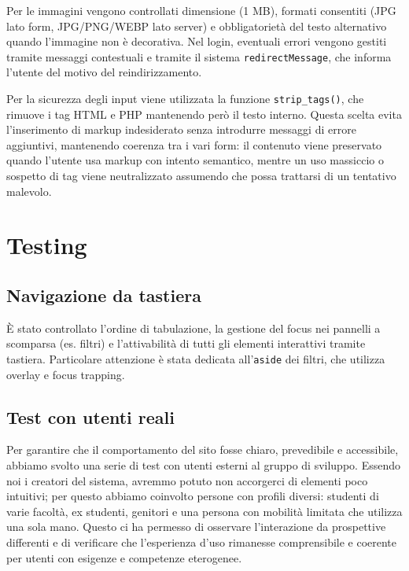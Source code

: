 \documentclass[a4paper,12pt]{article}
\begin{document}
Per le immagini vengono controllati dimensione (1 MB), formati consentiti (JPG lato form, JPG/PNG/WEBP lato server) e obbligatorietà del testo alternativo quando l’immagine non è decorativa. Nel login, eventuali errori vengono gestiti tramite messaggi contestuali e tramite il sistema \texttt{redirectMessage}, che informa l’utente del motivo del reindirizzamento.

Per la sicurezza degli input viene utilizzata la funzione \texttt{strip\_tags()}, che rimuove i tag HTML e PHP mantenendo però il testo interno. Questa scelta evita l’inserimento di markup indesiderato senza introdurre messaggi di errore aggiuntivi, mantenendo coerenza tra i vari form: il contenuto viene preservato quando l’utente usa markup con intento semantico, mentre un uso massiccio o sospetto di tag viene neutralizzato assumendo che possa trattarsi di un tentativo malevolo.

\section{Testing}
\subsection{Navigazione da tastiera}

È stato controllato l’ordine di tabulazione, la gestione del focus nei pannelli a scomparsa 
(es. filtri) e l’attivabilità di tutti gli elementi interattivi tramite tastiera.  
Particolare attenzione è stata dedicata all’\texttt{aside} dei filtri, che utilizza overlay e 
focus trapping.

\subsection{Test con utenti reali}
Per garantire che il comportamento del sito fosse chiaro, prevedibile e accessibile, abbiamo svolto una serie di test con utenti esterni al gruppo di sviluppo. Essendo noi i creatori del sistema, avremmo potuto non accorgerci di elementi poco intuitivi; per questo abbiamo coinvolto persone con profili diversi: studenti di varie facoltà, ex studenti, genitori e una persona con mobilità limitata che utilizza una sola mano. Questo ci ha permesso di osservare l’interazione da prospettive differenti e di verificare che l’esperienza d’uso rimanesse comprensibile e coerente per utenti con esigenze e competenze eterogenee.
\end{document}

